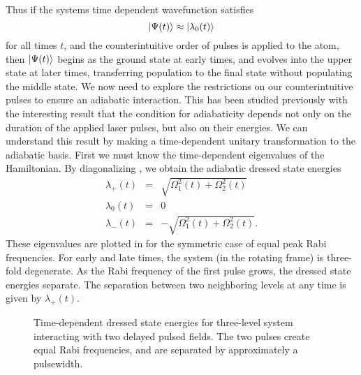 Thus if the systems time dependent wavefunction satisfies
\begin{equation}
\vert \Psi(t) \rangle \approx \vert \lambda_0(t) \rangle
\end{equation}
for all times $t$, and the counterintuitive order of
pulses is applied to the atom, then $\vert \Psi(t) \rangle$ begins as the ground state
at early times, and evolves into the upper state at later times, transferring
population to the final state without populating the middle state.  We now need
to explore the restrictions on our counterintuitive pulses to ensure an
adiabatic interaction. This has been studied previously \cite{Kuklinski:89}
with the interesting result that the condition for adiabaticity depends not only
on the duration of the applied laser pulses, but also on their energies.  We can
understand this result by making a time-dependent unitary transformation to the
adiabatic basis.  First we must know the time-dependent eigenvalues of the
Hamiltonian.  By diagonalizing
, we obtain the adiabatic dressed state energies
\begin{eqnarray}
\lambda_{+}(t) &=& \sqrt{\Omega_1^2(t) + \Omega_2^2(t)} \\
\lambda_{0}(t) &=& 0 \\
\lambda_{-}(t) &=& -\sqrt{\Omega_1^2(t) + \Omega_2^2(t)}.
\end{eqnarray}
These eigenvalues are plotted in  for the symmetric case of equal
peak Rabi frequencies. For early and late times, the system (in the rotating
frame) is three-fold degenerate.  As the Rabi frequency of the first pulse
grows, the dressed state energies separate.  The separation between two
neighboring levels at any time is given by $\lambda_+(t)$.

\begin{figure}[tbp]
\bigskip
{} {Time-dependent dressed state
energies for three-level system interacting with two delayed pulsed fields.
The two pulses create equal Rabi frequencies, and are separated by
approximately a pulsewidth.
\label{lips}}
\end{figure}

